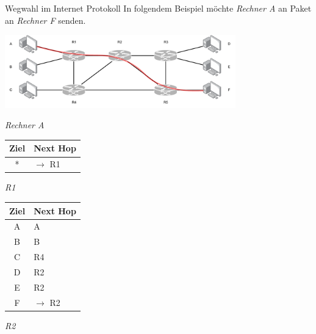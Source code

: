 \begin{example}{Wegwahl im Internet Protokoll}
    In folgendem Beispiel möchte \emph{Rechner A} an Paket an \emph{Rechner F} senden.

    \begin{center}
        \includegraphics[width=0.75\textwidth]{includes/figures/example_ip_routing.pdf }
    \end{center}

    \begin{minipage}{0.25\textwidth}
        \begin{center}
            \emph{Rechner A}

            \begin{tabular}{|c|l|}
                \hline
                \textbf{Ziel} & \textbf{Next Hop} \\\hline
                *             & $\to$ R1          \\\hline
            \end{tabular}
        \end{center}
    \end{minipage}
    \begin{minipage}{0.25\textwidth}
        \begin{center}
            \emph{R1}

            \begin{tabular}{|c|l|}
                \hline
                \textbf{Ziel} & \textbf{Next Hop} \\\hline
                A             & A                 \\
                B             & B                 \\
                C             & R4                \\
                D             & R2                \\
                E             & R2                \\
                F             & $\to$ R2          \\\hline
            \end{tabular}
        \end{center}
    \end{minipage}
    \begin{minipage}{0.25\textwidth}
        \begin{center}
            \emph{R2}


\end{center}
\end{minipage}
\end{example}
